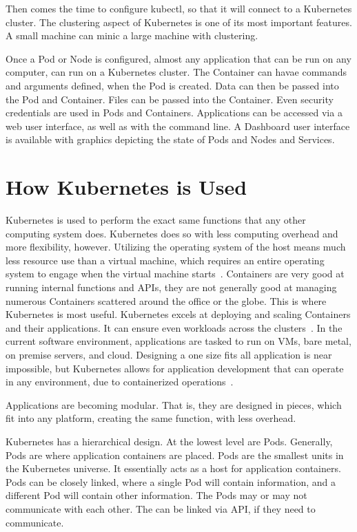 Then comes the time to configure kubectl, so that it will connect to a
Kubernetes cluster.  The clustering aspect of Kubernetes is one of its
most important features.  A small machine can minic a large machine
with clustering\cite{kubectl}.  

Once a Pod or Node is configured, almost any application that can be
run on any computer, can run on a Kubernetes cluster.  The Container
can havae commands and arguments defined, when the Pod is created.
Data can then be passed into the Pod and Container.  Files can be
passed into the Container.  Even security credentials are used in Pods
and Containers.  Applications can be accessed via a web user
interface, as well as with the command line.  A Dashboard user
interface is available with graphics depicting the state of Pods and
Nodes and Services\cite{dash}.


\section{How Kubernetes is Used}

Kubernetes is used to perform the exact same functions that any other
computing system does.  Kubernetes does so with less computing
overhead and more flexibility, however\cite{dash}.  Utilizing the
operating system of the host means much less resource use than a
virtual machine, which requires an entire operating system to engage
when the virtual machine starts~\cite{reasons}.  Containers are very
good at running internal functions and APIs, they are not generally
good at managing numerous Containers scattered around the office or
the globe.  This is where Kubernetes is most useful.  Kubernetes
excels at deploying and scaling Containers and their applications.  It
can ensure even workloads across the clusters~\cite{reasons}.  In the
current software environment, applications are tasked to run on VMs,
bare metal, on premise servers, and cloud.  Designing a one size fits
all application is near impossible, but Kubernetes allows for
application development that can operate in any environment, due to
containerized operations~\cite{reasons}.  

Applications are becoming modular.  That is, they are designed in
pieces, which fit into any platform, creating the same function, with
less overhead.  

Kubernetes has a hierarchical design.  At the lowest level are Pods.
Generally, Pods are where application containers are placed.  Pods are
the smallest units in the Kubernetes universe.  It essentially acts as
a host for application containers.  Pods can be closely linked, where
a single Pod will contain information, and a different Pod will
contain other information.  The Pods may or may not communicate with
each other.  The can be linked via API, if they need to
communicate.   

